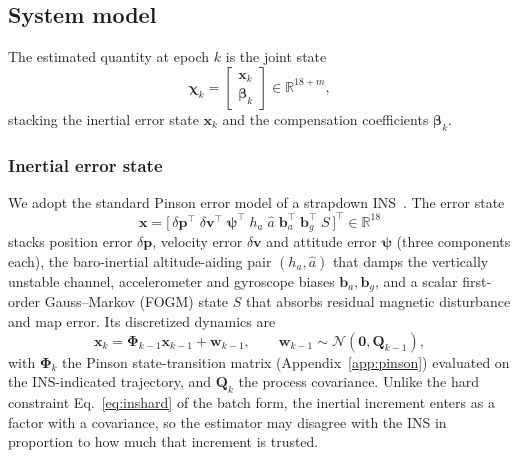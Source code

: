 \documentclass{IEEEtaes}
\begin{document}
\subsection{System model}\label{sec:sysmodel}
The estimated quantity at epoch $k$ is the joint state
\begin{equation}
\boldsymbol{\chi}_k=\begin{bmatrix}\mathbf{x}_k\\ \boldsymbol{\beta}_k\end{bmatrix}
\in\mathbb{R}^{18+m},
\label{eq:jointstate}
\end{equation}
stacking the inertial error state $\mathbf{x}_k$ and the compensation
coefficients $\boldsymbol{\beta}_k$.

\subsubsection{Inertial error state}
We adopt the standard Pinson error model of a strapdown
INS~\cite{groves2013,titterton2004,farrell2008}. The error state
\begin{equation}
\mathbf{x}=\big[\,\delta\mathbf{p}^{\top}\;\delta\mathbf{v}^{\top}\;
\boldsymbol{\psi}^{\top}\;h_a\;\hat{a}\;\mathbf{b}_a^{\top}\;\mathbf{b}_g^{\top}\;S\,\big]^{\top}
\in\mathbb{R}^{18}
\label{eq:state}
\end{equation}
stacks position error $\delta\mathbf{p}$, velocity error $\delta\mathbf{v}$ and
attitude error $\boldsymbol{\psi}$ (three components each), the baro-inertial
altitude-aiding pair $(h_a,\hat{a})$ that damps the vertically unstable channel,
accelerometer and gyroscope biases $\mathbf{b}_a,\mathbf{b}_g$, and a scalar
first-order Gauss--Markov (FOGM) state $S$ that absorbs residual magnetic
disturbance and map error. Its discretized dynamics are
\begin{equation}
\mathbf{x}_{k}=\boldsymbol{\Phi}_{k-1}\mathbf{x}_{k-1}+\mathbf{w}_{k-1},
\qquad \mathbf{w}_{k-1}\sim\mathcal{N}(\mathbf{0},\mathbf{Q}_{k-1}),
\label{eq:dyn}
\end{equation}
with $\boldsymbol{\Phi}_{k}$ the Pinson state-transition matrix
(Appendix~\ref{app:pinson}) evaluated on the INS-indicated trajectory, and
$\mathbf{Q}_{k}$ the process covariance. Unlike the hard
constraint Eq.~\eqref{eq:inshard} of the batch form, the inertial increment enters
as a factor with a covariance, so the estimator may disagree with the INS in
proportion to how much that increment is trusted.
\end{document}
